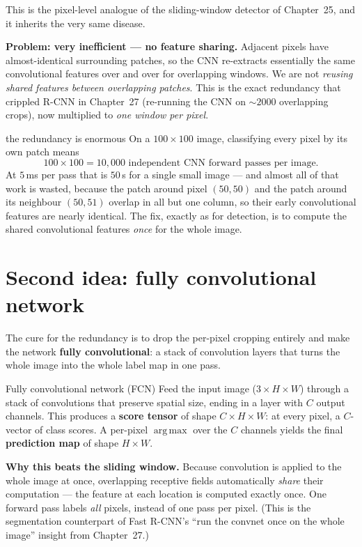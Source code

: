 \documentclass{report}
\DeclareMathOperator*{\argmax}{arg\,max}
\begin{document}
This is the pixel-level analogue of the sliding-window detector of Chapter~25,
and it inherits the very same disease.

\begin{keybox}
\textbf{Problem: very inefficient --- no feature sharing.} Adjacent pixels have
almost-identical surrounding patches, so the CNN re-extracts essentially the
same convolutional features over and over for overlapping windows. We are not
\emph{reusing shared features between overlapping patches}. This is the exact
redundancy that crippled R-CNN in Chapter~27 (re-running the CNN on $\sim2000$
overlapping crops), now multiplied to \emph{one window per pixel}.
\end{keybox}

\begin{exbox}{the redundancy is enormous}
On a $100\times100$ image, classifying every pixel by its own patch means
\[
100\times 100 = 10{,}000 \text{ independent CNN forward passes per image.}
\]
At $5$\,ms per pass that is $50$\,s for a single small image --- and almost all
of that work is wasted, because the patch around pixel $(50,50)$ and the patch
around its neighbour $(50,51)$ overlap in all but one column, so their early
convolutional features are nearly identical. The fix, exactly as for detection,
is to compute the shared convolutional features \emph{once} for the whole image.
\end{exbox}

\section{Second idea: fully convolutional network}

The cure for the redundancy is to drop the per-pixel cropping entirely and make
the network \textbf{fully convolutional}: a stack of convolution layers that
turns the whole image into the whole label map in one pass.

\begin{defbox}{Fully convolutional network (FCN)}
Feed the input image ($3\times H\times W$) through a stack of convolutions that
preserve spatial size, ending in a layer with $C$ output channels. This
produces a \textbf{score tensor} of shape $C\times H\times W$: at every pixel, a
$C$-vector of class scores. A per-pixel $\argmax$ over the $C$ channels yields
the final \textbf{prediction map} of shape $H\times W$.
\end{defbox}

\begin{keybox}
\textbf{Why this beats the sliding window.} Because convolution is applied to
the whole image at once, overlapping receptive fields automatically
\emph{share} their computation --- the feature at each location is computed
exactly once. One forward pass labels \emph{all} pixels, instead of one pass per
pixel. (This is the segmentation counterpart of Fast R-CNN's ``run the convnet
once on the whole image'' insight from Chapter~27.)
\end{keybox}
\end{document}

